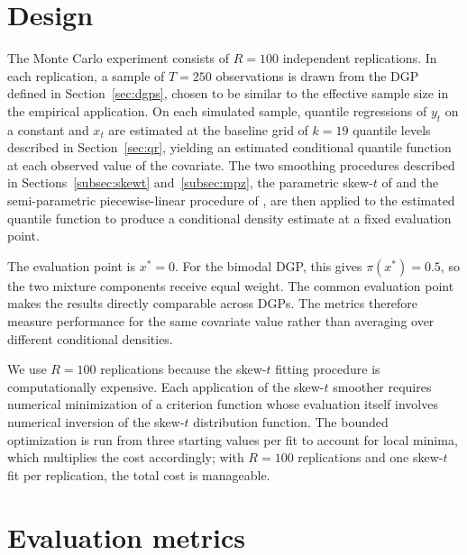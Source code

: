 \documentclass[12pt]{report} %
\begin{document}
\section{Design}
\label{sec:mc-design}

The Monte Carlo experiment consists of $R = 100$ independent replications. In each replication, a sample of $T = 250$ observations is drawn from the DGP defined in Section~\ref{sec:dgps}, chosen to be similar to the effective sample size in the empirical application. On each simulated sample, quantile regressions of $y_t$ on a constant and $x_t$ are estimated at the baseline grid of $k = 19$ quantile levels described in Section~\ref{sec:qr}, yielding an estimated conditional quantile function at each observed value of the covariate. The two smoothing procedures described in Sections~\ref{subsec:skewt} and~\ref{subsec:mpz}, the parametric skew-$t$ of \textcite{adrian2019vulnerable} and the semi-parametric piecewise-linear procedure of \textcite{mitchell2024constructing}, are then applied to the estimated quantile function to produce a conditional density estimate at a fixed evaluation point.

The evaluation point is $x^* = 0$. For the bimodal DGP, this gives $\pi(x^*) = 0.5$, so the two mixture components receive equal weight. The common evaluation point makes the results directly comparable across DGPs. The metrics therefore measure performance for the same covariate value rather than averaging over different conditional densities.

We use $R=100$ replications because the skew-$t$ fitting procedure is computationally expensive. Each application of the skew-$t$ smoother requires numerical minimization of a criterion function whose evaluation itself involves numerical inversion of the skew-$t$ distribution function. The bounded optimization is run from three starting values per fit to account for local minima, which multiplies the cost accordingly; with $R = 100$ replications and one skew-$t$ fit per replication, the total cost is manageable.

\section{Evaluation metrics}
\label{sec:mc-metrics}
\end{document}
